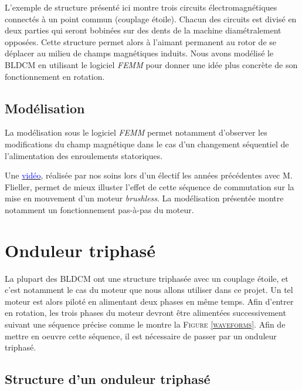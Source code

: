 			L'exemple de structure présenté ici montre trois circuits 
			électromagnétiques connectés à un point commun (couplage étoile). 
			Chacun des circuits est divisé en deux parties qui seront bobinées
			sur des dents de la machine diamétralement opposées. 
			Cette structure permet alors à l'aimant permanent au rotor de se
			déplacer au milieu de champs magnétiques induits. 
			Nous avons modélisé le BLDCM en utilisant le logiciel \textit{FEMM}
			pour donner une idée plus concrète de son fonctionnement en rotation. 
				 
			\subsection{Modélisation}
				 
			La modélisation sous le logiciel \textit{FEMM} permet notamment d'observer
			les modifications du champ magnétique dans le cas d'un changement
			séquentiel de l'alimentation des enroulements statoriques.
				 
			Une \href{https://www.youtube.com/watch?v=pMH3krwI\_W0}{\textcolor{blue}{vidéo}}, 
			réalisée par nos soins lors d'un électif les années
			précédentes avec M. Flieller, permet de mieux illuster l'effet
			de cette séquence de commutation sur la mise en mouvement d'un
			moteur \textit{brushless}. La modélisation présentée montre
			notamment un fonctionnement pas-à-pas du moteur.
						 
	\newpage
	
	\section{Onduleur triphasé}
	\label{onduleur}		%
							
	La plupart des BLDCM ont une structure triphasée avec un 
	couplage étoile, et c'est notamment le cas du moteur que 
	nous allons utiliser dans ce projet. 
	Un tel moteur est alors piloté en alimentant deux phases 
	en même temps. Afin d'entrer en rotation, les trois phases
	du moteur devront être alimentées successivement suivant 
	une séquence précise comme le montre la 
	\textsc{Figure \ref{waveforms}}.
	Afin de mettre en oeuvre cette séquence, il est nécessaire
	de passer par un onduleur triphasé.
	
		\subsection{Structure d'un onduleur triphasé}
		
